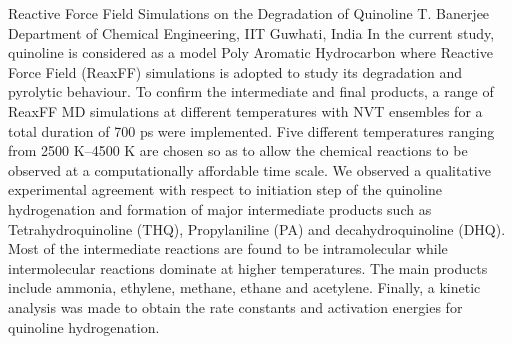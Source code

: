 
    \begin{abstract_online}{Reactive Force Field Simulations on the Degradation of Quinoline}{%
        T. Banerjee}{%
        \IStag}{%
        Department of Chemical Engineering, IIT Guwhati, India}
    In the current study, quinoline is considered as a model Poly Aromatic Hydrocarbon where Reactive Force Field (ReaxFF) simulations is adopted to study its degradation and pyrolytic behaviour. To confirm the intermediate and final products, a range of ReaxFF MD simulations at different temperatures with NVT ensembles for a total duration of 700 ps were implemented. Five different temperatures ranging from 2500 K–4500 K are chosen so as to allow the chemical reactions to be observed at a computationally affordable time scale. We observed a qualitative experimental agreement with respect to initiation step of the quinoline hydrogenation and formation of major intermediate products such as Tetrahydroquinoline (THQ), Propylaniline (PA) and decahydroquinoline (DHQ). Most of the intermediate reactions are found to be intramolecular while intermolecular reactions dominate at higher temperatures. The main products include ammonia, ethylene, methane, ethane and acetylene. Finally, a kinetic analysis was made to obtain the rate constants and activation energies for quinoline hydrogenation. 
    
    \end{abstract_online}
    